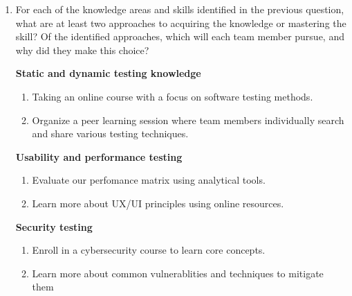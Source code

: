 \documentclass[12pt, titlepage]{article}
\begin{document}
\begin{enumerate}
	\item For each of the knowledge areas and skills identified in the previous
	question, what are at least two approaches to acquiring the knowledge or
	mastering the skill?  Of the identified approaches, which will each team
	member pursue, and why did they make this choice?
	
	\textbf{Static and dynamic testing knowledge} 
	\begin{enumerate}
		\item Taking an online course with a focus on software testing methods.
		\item Organize a peer learning session where team members individually
		search and share various testing techniques.
	\end{enumerate}
	\textbf{Usability and performance testing} 
	\begin{enumerate}
		\item Evaluate our perfomance matrix using analytical tools.
		\item Learn more about UX/UI principles using online resources.
	\end{enumerate}
	\textbf{Security testing}
	\begin{enumerate}
		\item Enroll in a cybersecurity course to learn core concepts.
		\item Learn more about common vulnerablities and techniques to mitigate them
	\end{enumerate}
	  
\end{enumerate}
\end{document}
